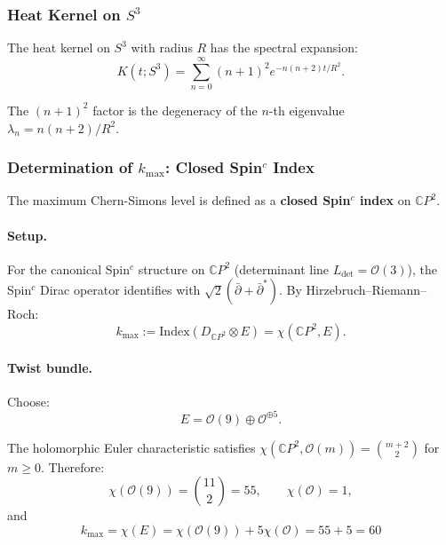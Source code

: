\subsubsection{Heat Kernel on $S^3$}

The heat kernel on $S^3$ with radius $R$ has the spectral expansion:
\begin{equation}
K(t; S^3) = \sum_{n=0}^{\infty} (n+1)^2 e^{-n(n+2)t/R^2}.
\end{equation}

The $(n+1)^2$ factor is the degeneracy of the $n$-th eigenvalue $\lambda_n = n(n+2)/R^2$.

\subsubsection{Determination of $k_{\max}$: Closed Spin$^c$ Index}

The maximum Chern-Simons level is defined as a \textbf{closed Spin$^c$ index} on $\mathbb{C}P^2$.

\paragraph{Setup.}
For the canonical Spin$^c$ structure on $\mathbb{C}P^2$ (determinant line $L_{\det} = \mathcal{O}(3)$), the Spin$^c$ Dirac operator identifies with $\sqrt{2}(\bar\partial + \bar\partial^*)$. By Hirzebruch--Riemann--Roch:
\begin{equation}
k_{\max} := \mathrm{Index}(D_{\mathbb{C}P^2} \otimes E) = \chi(\mathbb{C}P^2, E).
\end{equation}

\paragraph{Twist bundle.}
Choose:
\begin{equation}
E = \mathcal{O}(9) \oplus \mathcal{O}^{\oplus 5}.
\end{equation}

The holomorphic Euler characteristic satisfies $\chi(\mathbb{C}P^2, \mathcal{O}(m)) = \binom{m+2}{2}$ for $m \geq 0$. Therefore:
\begin{equation}
\chi(\mathcal{O}(9)) = \binom{11}{2} = 55, \qquad \chi(\mathcal{O}) = 1,
\end{equation}
and
\begin{equation}\label{eq:kmax-final}
\boxed{k_{\max} = \chi(E) = \chi(\mathcal{O}(9)) + 5\chi(\mathcal{O}) = 55 + 5 = 60}
\end{equation}

